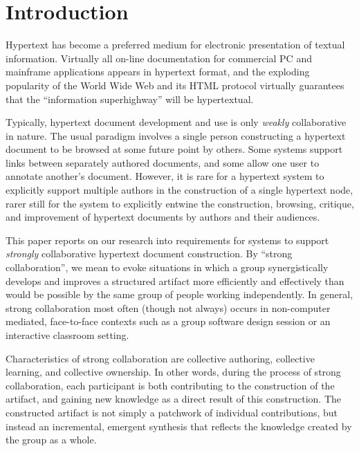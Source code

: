 
\section{Introduction}

Hypertext has become a preferred medium for electronic presentation of
textual information.  Virtually all on-line documentation for commercial PC
and mainframe applications appears in hypertext format, and the exploding
popularity of the World Wide Web \cite{Berners-Lee94} and its HTML protocol 
virtually guarantees that the ``information superhighway'' will be
hypertextual.

Typically, hypertext document development and use is only {\em weakly\/}
collaborative in nature.  The usual paradigm involves a single person
constructing a hypertext document to be browsed at some future point by
others. Some systems support links between separately authored documents,
and some allow one user to annotate another's document.  However, it is
rare for a hypertext system to explicitly support multiple authors in the
construction of a single hypertext node, rarer still for the system to
explicitly entwine the construction, browsing, critique, and improvement of
hypertext documents by authors and their audiences.

This paper reports on our research into requirements for systems to
support {\em strongly\/} collaborative hypertext document construction.  By ``strong
collaboration'', we mean to evoke situations in which a group
synergistically develops and improves a structured artifact more
efficiently and effectively than would be possible by the same group of
people working independently.  In general, strong collaboration most often
(though not always) occurs in non-computer mediated, face-to-face contexts such as a group
software design session or an interactive classroom setting.

Characteristics of strong collaboration are collective authoring,
collective learning, and collective ownership. In other words, during the
process of strong collaboration, each participant is both contributing to
the construction of the artifact, and gaining new knowledge as a direct
result of this construction.  The constructed artifact is not simply a
patchwork of individual contributions, but instead an incremental, emergent
synthesis that reflects the knowledge created by the group as a whole.

